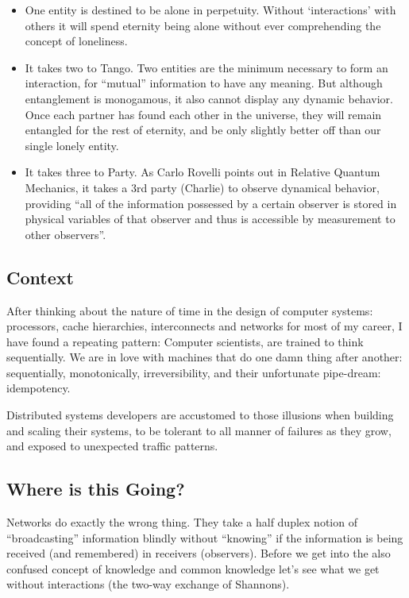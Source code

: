 \documentclass[../../../OAE-SPEC-MAIN.tex]{subfiles}
\begin{document}
\begin{itemize}
  \item One entity is destined to be alone in perpetuity. Without ‘interactions' with others it will spend eternity being alone without ever comprehending the concept of loneliness.
  \item It takes two to Tango. Two entities are the minimum necessary to form an interaction, for “mutual” information to have any meaning. But although entanglement is monogamous, it also cannot display any dynamic behavior. Once each partner has found each other in the universe, they will remain entangled for the rest of eternity, and be only slightly better off than our single lonely entity.
  \item It takes three to Party. As Carlo Rovelli points out in Relative Quantum Mechanics, it takes a 3rd party (Charlie) to observe dynamical behavior, providing “all of the information possessed by a certain observer is stored in physical variables of that observer and thus is accessible by measurement to other observers”.
\end{itemize}

\subsection{Context}
After thinking about the nature of time in the design of computer systems: processors, cache hierarchies, interconnects and networks for most of my career, I have found a repeating pattern: Computer scientists, are trained to think sequentially. We are in love with machines that do one damn thing after another: sequentially, monotonically, irreversibility, and their unfortunate pipe-dream: idempotency. 

Distributed systems developers are accustomed to  those illusions when building and scaling their systems, to be tolerant to all manner of failures as they grow, and exposed to unexpected traffic patterns.

\subsection{Where is this Going?}
Networks do exactly the wrong thing. They take a half duplex notion of “broadcasting” information blindly without “knowing” if the information is being received (and remembered) in receivers (observers).  Before we get into the also confused concept of knowledge and common knowledge let’s see what we get without interactions (the two-way exchange of Shannons).
\end{document}
